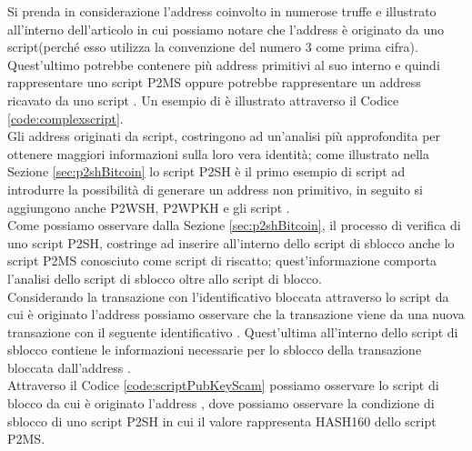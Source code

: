 \begin{example}\label{ex:probleGraphAddress}
   Si prenda in considerazione l'address  coinvolto in numerose truffe e illustrato all'interno dell'articolo \cite{DBLP:conf/icdm/OggierPD18} in cui possiamo notare che l'address è originato da uno script(perché esso utilizza la convenzione del numero 3 come prima cifra).
   Quest'ultimo potrebbe contenere più address primitivi al suo interno e quindi rappresentare uno script P2MS oppure potrebbe rappresentare un address ricavato da uno script . Un esempio di  è illustrato attraverso il Codice \ref{code:complexscript}.\\
   Gli address originati da script, costringono ad un'analisi più approfondita per ottenere maggiori informazioni sulla loro vera identità; come illustrato nella Sezione \ref{sec:p2shBitcoin} lo script P2SH è il primo esempio di script ad introdurre la possibilità di generare un address non primitivo, in seguito si aggiungono anche P2WSH, P2WPKH e gli script .\\
   Come possiamo osservare dalla Sezione \ref{sec:p2shBitcoin}, il processo di verifica di uno script P2SH, costringe ad inserire all'interno dello script di sblocco anche lo script P2MS conosciuto come script di riscatto; quest'informazione comporta l'analisi dello script di sblocco oltre allo script di blocco.\\
   Considerando la transazione con l'identificativo  bloccata attraverso lo script da cui è originato l'address  possiamo osservare che la transazione viene  da una nuova transazione con il seguente identificativo . Quest'ultima all'interno dello script di sblocco contiene le informazioni necessarie per lo sblocco della transazione bloccata dall'address .\\
   Attraverso il Codice \ref{code:scriptPubKeyScam} possiamo osservare lo script di blocco da cui è originato l'address , dove possiamo osservare la condizione di sblocco di uno script P2SH in cui il valore  rappresenta HASH160 dello script P2MS.
   \begin{lstlisting}[language=bitcoinscript, label={code:scriptPubKeyScam}, caption={Script da cui è originato l'address preso in esempio.}]

\end{lstlisting}
\end{example}
